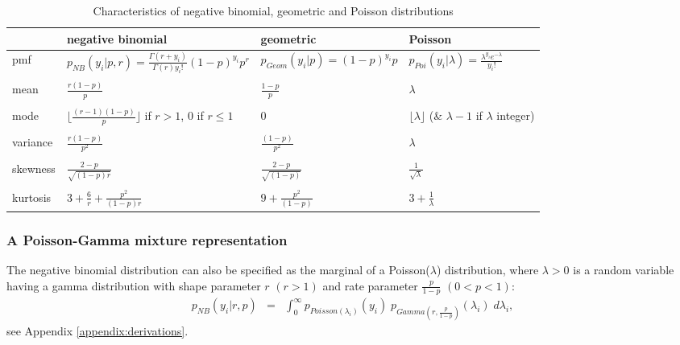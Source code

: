 \documentclass[11pt]{article}
\begin{document}
\begin{table}
\caption{\label{Characteristics_NB_Geom_Poi} Characteristics of negative binomial, geometric and Poisson distributions}
\begin{tabular}{llll}
\hline  
& negative binomial & geometric & Poisson \\
\hline
pmf & $p_{NB}(y_i|p,r) = \frac{\Gamma(r+y_i)}{\Gamma(r) y_i!} (1-p)^{y_i} p^r$ &
$p_{Geom}(y_i|p) = (1-p)^{y_i} p$ & 
$p_{Poi}(y_i|\lambda) = \frac{ \lambda^{y_i} e^{-\lambda} }{y_i!} $ \\
\\
mean & $\frac{r(1-p)}{p}$ & $\frac{1-p}{p}$  & $\lambda$  \\
\\
mode & $\lfloor \frac{(r-1)(1-p)}{p} \rfloor$ if $r>1$, 0 if $r \le 1$ & 
0  & 
$\lfloor \lambda \rfloor$ (\& $\lambda-1$ if $\lambda$ integer) \\
\\
variance & $\frac{r(1-p)}{p^2}$ & $\frac{(1-p)}{p^2}$  & $\lambda$ \\
\\
skewness & $\frac{2-p}{\sqrt{(1-p)r}}$ & $\frac{2-p}{\sqrt{(1-p)}}$ & $\frac{1}{\sqrt{\lambda}}$ \\
\\
kurtosis   &  $3 + \frac{6}{r} + \frac{p^2}{(1-p)r}$ & $9 + \frac{p^2}{(1-p)}$ & 
$3 + \frac{1}{\lambda}$\\
\hline
\end{tabular}
\end{table}



\subsubsection{A Poisson-Gamma mixture representation}

The negative binomial distribution can also be specified as the marginal of a Poisson($\lambda$) distribution, where $\lambda > 0$ is a random variable having a gamma distribution with shape parameter $r$ $(r > 1)$ and rate parameter $\frac{p}{1-p}$ $(0<p<1)$:
\begin{eqnarray}\label{Poisson-gamma}
p_{NB}(y_i|r,p) 
&=& \int_{0}^{\infty} p_{Poisson(\lambda_i)}(y_i)  \; p_{Gamma\left(r,\frac{p}{1-p}\right)}(\lambda_i) \; d\lambda_i, 
\end{eqnarray} 
see Appendix \ref{appendix:derivations}. 
\end{document}
